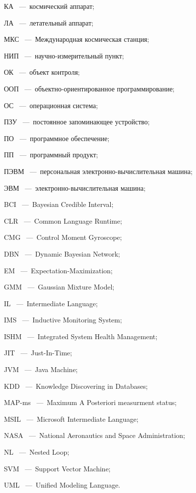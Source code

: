 \begin{abbreviation}
\item[КА]~---~космический аппарат;
\item[ЛА]~---~летательный аппарат;
\item[МКС]~---~Международная космическая станция;
\item[НИП]~---~научно-измерительный пункт;
\item[ОК]~---~объект контроля;
\item[ООП]~---~объектно-ориентированное программирование;
\item[ОС]~---~операционная система;
\item[ПЗУ]~---~постоянное запоминающее устройство;
\item[ПО]~---~программное обеспечение;
\item[ПП]~---~программный продукт;
\item[ПЭВМ]~---~персональная электронно-вычислительная машина;
\item[ЭВМ]~---~электронно-вычислительная машина;
\smallskip
\item[BCI]~---~Bayesian Credible Interval;
\item[CLR]~---~Common Language Runtime;
\item[CMG]~---~Control Moment Gyroscope;
\item[DBN]~---~Dynamic Bayesian Network;
\item[EM]~---~Expectation-Maximization;
\item[GMM]~---~Gaussian Mixture Model;
\item[IL]~---~Intermediate Language;
\item[IMS]~---~Inductive Monitoring System;
\item[ISHM]~---~Integrated System Health Management;
\item[JIT]~---~Just-In-Time;
\item[JVM]~---~Java Machine;
\item[KDD]~---~Knowledge Discovering in Databases;
\item[MAP-ms]~---~Maximum A Posteriori measurment status;
\item[MSIL]~---~Microsoft Intermediate Language;
\item[NASA]~---~National Aeronautics and Space Administration;
\item[NL]~---~Nested Loop;
\item[SVM]~---~Support Vector Machine;
\item[UML]~---~Unified Modeling Language.
\end{abbreviation}